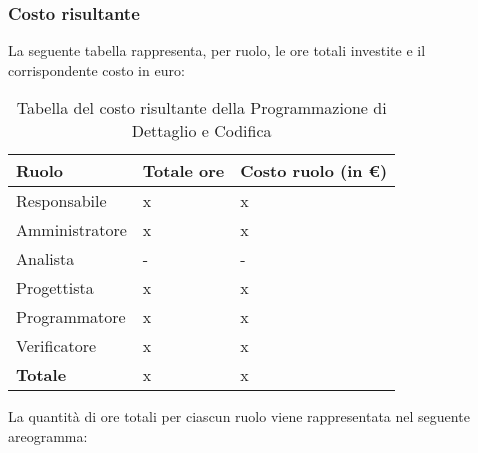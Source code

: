 \subsubsection{Costo risultante}
La seguente tabella rappresenta, per ruolo, le ore totali investite e il corrispondente costo in euro:
{
\renewcommand{\arraystretch}{2}
\begin{longtable}{ C{3cm} C{2cm} C{4cm}}
\caption{Tabella del costo risultante della Programmazione di Dettaglio e Codifica}\\
\rowcolor{\primaryColor}

\textcolor{\secondaryColor}{\textbf{Ruolo}} & 
\textcolor{\secondaryColor}{\textbf{Totale ore}} & 
\textcolor{\secondaryColor}{\textbf{Costo ruolo (in \euro{})}}\\	
\endhead
        
Responsabile    & x & x \\
Amministratore  & x & x \\
Analista        & - & - \\
Progettista     & x & x \\
Programmatore   & x & x \\
Verificatore    & x & x \\
\textbf{Totale} & x & x \\
		
\end{longtable}
}


\vskip 30pt %
La quantità di ore totali per ciascun ruolo viene rappresentata nel seguente areogramma:
\begin{center}
\end{center}